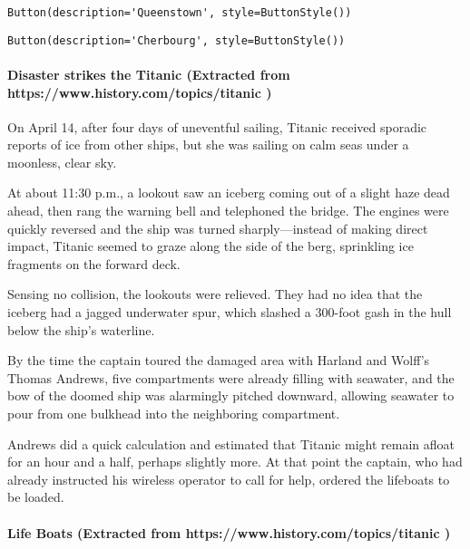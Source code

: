 \documentclass[11pt]{article}
\begin{document}
    
    
    \begin{verbatim}
Button(description='Queenstown', style=ButtonStyle())
    \end{verbatim}

    
    
    \begin{verbatim}
Button(description='Cherbourg', style=ButtonStyle())
    \end{verbatim}

    
    \paragraph{Disaster strikes the Titanic (Extracted from
https://www.history.com/topics/titanic
)}\label{disaster-strikes-the-titanic-extracted-from-httpswww.history.comtopicstitanic}

On April 14, after four days of uneventful sailing, Titanic received
sporadic reports of ice from other ships, but she was sailing on calm
seas under a moonless, clear sky.

At about 11:30 p.m., a lookout saw an iceberg coming out of a slight
haze dead ahead, then rang the warning bell and telephoned the bridge.
The engines were quickly reversed and the ship was turned
sharply---instead of making direct impact, Titanic seemed to graze along
the side of the berg, sprinkling ice fragments on the forward deck.

Sensing no collision, the lookouts were relieved. They had no idea that
the iceberg had a jagged underwater spur, which slashed a 300-foot gash
in the hull below the ship's waterline.

By the time the captain toured the damaged area with Harland and Wolff's
Thomas Andrews, five compartments were already filling with seawater,
and the bow of the doomed ship was alarmingly pitched downward, allowing
seawater to pour from one bulkhead into the neighboring compartment.

Andrews did a quick calculation and estimated that Titanic might remain
afloat for an hour and a half, perhaps slightly more. At that point the
captain, who had already instructed his wireless operator to call for
help, ordered the lifeboats to be loaded.

    \paragraph{Life Boats (Extracted from
https://www.history.com/topics/titanic
)}\label{life-boats-extracted-from-httpswww.history.comtopicstitanic}
\end{document}
